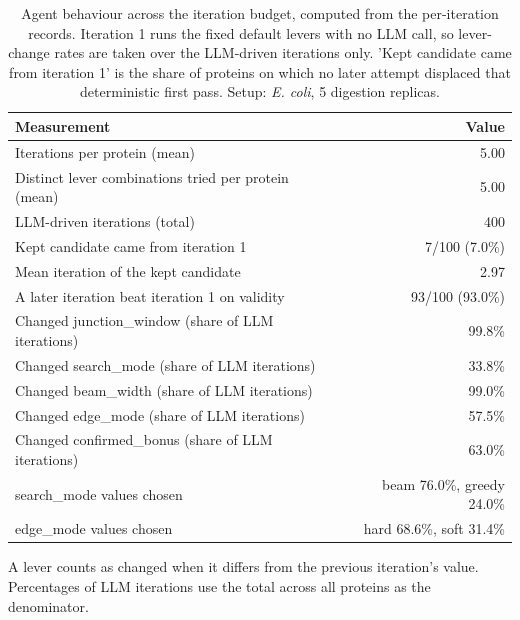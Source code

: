 \begin{table}[!tb]
  \centering
  \caption{Agent behaviour across the iteration budget, computed from the per-iteration records. Iteration 1 runs the fixed default levers with no LLM call, so lever-change rates are taken over the LLM-driven iterations only. 'Kept candidate came from iteration 1' is the share of proteins on which no later attempt displaced that deterministic first pass. Setup: \textnormal{\textnormal{\textit{E. coli}}}, 5 digestion replicas.}
  \label{tab:agent_behaviour_ecoli_r5}
  \begin{tabular}{lr}
    \toprule
    Measurement & Value \\
    \midrule
    Iterations per protein (mean) & 5.00 \\
    Distinct lever combinations tried per protein (mean) & 5.00 \\
    LLM-driven iterations (total) & 400 \\
    Kept candidate came from iteration 1 & 7/100 (7.0\%) \\
    Mean iteration of the kept candidate & 2.97 \\
    A later iteration beat iteration 1 on validity & 93/100 (93.0\%) \\
    Changed junction\_window (share of LLM iterations) & 99.8\% \\
    Changed search\_mode (share of LLM iterations) & 33.8\% \\
    Changed beam\_width (share of LLM iterations) & 99.0\% \\
    Changed edge\_mode (share of LLM iterations) & 57.5\% \\
    Changed confirmed\_bonus (share of LLM iterations) & 63.0\% \\
    search\_mode values chosen & beam 76.0\%, greedy 24.0\% \\
    edge\_mode values chosen & hard 68.6\%, soft 31.4\% \\
    \bottomrule
  \end{tabular}
  \par\smallskip\footnotesize{A lever counts as changed when it differs from the previous iteration's value. Percentages of LLM iterations use the total across all proteins as the denominator.}
\end{table}

